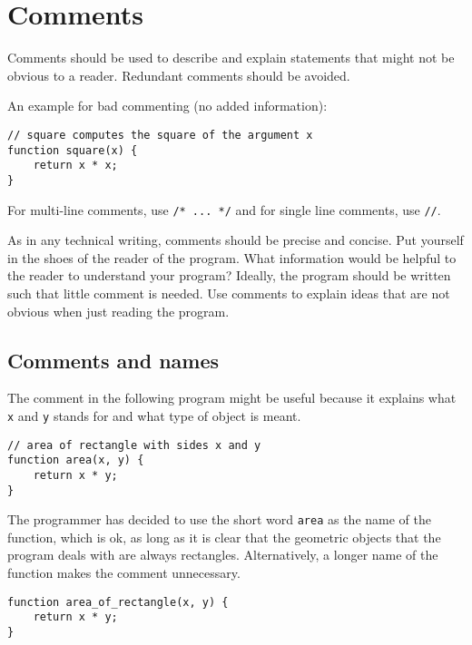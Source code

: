 \vspace{-4mm}

\section*{Comments}
Comments should be used to describe and explain statements 
that might not be obvious to a reader.
Redundant comments should be avoided. 

An example for bad commenting (no added information):
\begin{lstlisting}
// square computes the square of the argument x
function square(x) {
    return x * x;
}
\end{lstlisting}
%
For multi-line comments, use \lstinline{/* ... */} and for single line comments, use \lstinline{//}.

As in any technical writing, comments should be precise and concise. Put yourself in the
shoes of the reader of the program. What information would be helpful to the reader to
understand your program? Ideally, the program should be written such that little comment is
needed. Use comments to explain ideas that are not obvious when just reading the program.

\subsection*{Comments and names}

The comment in the following program might be
useful because it explains what \lstinline{x} and \lstinline{y} stands for and what type of
object is meant. 
\begin{lstlisting}
// area of rectangle with sides x and y
function area(x, y) {
    return x * y;
}
\end{lstlisting}
The programmer has decided to use the short word \lstinline{area} as the name of the function,
which is ok, as long as it is clear that the geometric objects that the program deals with
are always rectangles. Alternatively, a longer name of the function makes the comment
unnecessary.
\begin{lstlisting}
function area_of_rectangle(x, y) {
    return x * y;
}
\end{lstlisting}



      
